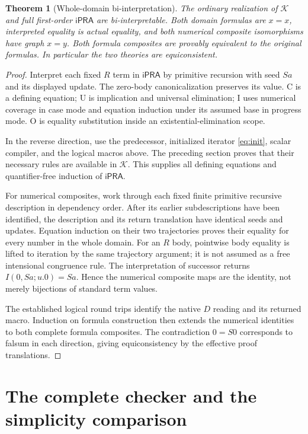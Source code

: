 \documentclass[11pt]{article}
\newtheorem{theorem}{Theorem}[section]
\theoremstyle{definition}\newtheorem{definition}[theorem]{Definition}
\newcommand{\ipra}{\mathsf{iPRA}}
\newcommand{\K}{\mathcal K}
\begin{document}
\begin{theorem}[Whole-domain bi-interpretation]
The ordinary realization of $\K$ and full first-order $\ipra$ are
bi-interpretable. Both domain formulas are $x=x$, interpreted equality
is actual equality, and both numerical composite isomorphisms have
graph $x=y$. Both formula composites are provably equivalent to the
original formulas. In particular the two theories are equiconsistent.
\end{theorem}
\begin{proof}
Interpret each fixed $R$ term in $\ipra$ by primitive recursion with
seed $Sa$ and its displayed update. The zero-body canonicalization
preserves its value. C is a defining equation; U is implication and
universal elimination; I uses numerical coverage in case mode and
equation induction under its assumed base in progress mode. O is
equality substitution inside an existential-elimination scope.

In the reverse direction, use the predecessor, initialized iterator
\eqref{eq:init}, scalar compiler, and the logical macros above. The
preceding section proves that their necessary rules are available in
$\K$. This supplies all defining equations and quantifier-free
induction of $\ipra$.

For numerical composites, work through each fixed finite primitive
recursive description in dependency order. After its earlier
subdescriptions have been identified, the description and its return
translation have identical seeds and updates. Equation induction on
their two trajectories proves their equality for every number in the
whole domain. For an $R$ body, pointwise body equality is lifted to
iteration by the same trajectory argument; it is not assumed as a
free intensional congruence rule. The interpretation of successor
returns $I(0,Sa;u.0)=Sa$. Hence the numerical composite maps are
the identity, not merely bijections of standard term values.

The established logical round trips identify the native $D$ reading
and its returned macro. Induction on formula construction then extends
the numerical identities to both complete formula composites. The
contradiction $0=S0$ corresponds to falsum in each direction, giving
equiconsistency by the effective proof translations.
\end{proof}

\section{The complete checker and the simplicity comparison}
\end{document}
